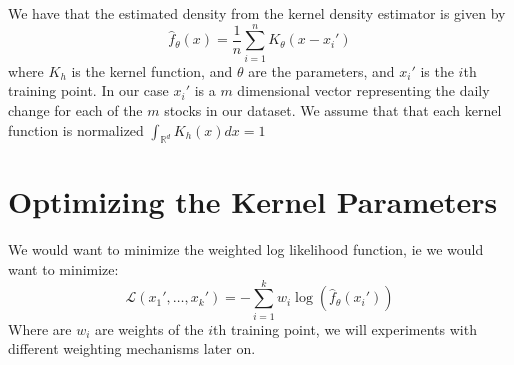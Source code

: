 \documentclass[10pt]{article}
\author{Lawrence Liu}
\begin{document}
We have that the estimated density from the kernel density estimator is given by
\begin{equation}
\hat{f}_{\theta}(x) = \frac{1}{n} \sum_{i=1}^n K_{\theta}(x-x_i')
\end{equation}
where $K_h$ is the kernel function, and $\theta$ are the parameters, and $x_i'$ is the $i$th training point. 
In our case $x_i'$ is a $m$ dimensional vector representing the daily change for each of the $m$ stocks in our dataset.
We assume that that each kernel function is normalized $\int_{\mathbb{R}^d} K_h(x) dx = 1$
\section*{Optimizing the Kernel Parameters}
We would want to minimize the weighted log likelihood function, ie we would want to minimize:
\begin{equation}
    \mathcal{L}(x_1',\dots,x_k') = -\sum_{i=1}^k w_i\log(\hat{f}_{\theta}(x_i'))
\end{equation}
Where are $w_i$ are weights of the $i$th training point, we will experiments with different weighting mechanisms later on.
\end{document}
